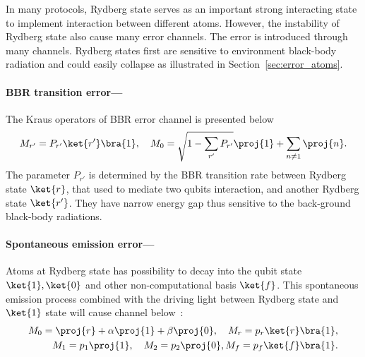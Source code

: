 \documentclass[11pt]{article}
\begin{document}
In many protocols, Rydberg state serves as an important strong interacting state to implement interaction between different atoms. However, the instability of Rydberg state also cause many error channels.
The error is introduced through many channels. Rydberg states first are sensitive to environment black-body radiation and could easily collapse as illustrated in Section~\ref{sec:error_atoms}. 
\paragraph*{BBR transition error---\!\!\!}
The Kraus operators of BBR error channel is presented below~\cite{PhysRevX.12.021049}
\begin{align}
M_{r'} = P_{r'} \ket{r'}\bra{1}, \quad M_0 = \sqrt{1 - \sum_{r'}P_{r'}} \proj{1} + \sum_{n \neq 1}\proj{n}.    
\end{align}
The parameter $P_{r'}$ is determined by the BBR transition rate between Rydberg state $\ket{r}$, that used to mediate two qubits interaction, and another Rydberg state $\ket{r'}$. They have narrow energy gap thus sensitive to the back-ground black-body radiations. 

\paragraph*{Spontaneous emission error---\!\!\!}
Atoms at Rydberg state has possibility to decay into the qubit state $\ket{1},\ket{0}$ and other non-computational basis $\ket{f}$. This spontaneous emission process combined with the driving light between Rydberg state and $\ket{1}$ state will cause channel below~\cite{PhysRevX.12.021049}:
\begin{align}
    M_0 = \proj{r} + \alpha \proj{1} + \beta \proj{0}, \quad M_r = p_r \ket{r}\bra{1}, \\
    \quad M_1 = p_1\proj{1}, \quad M_2 = p_2 \proj{0},M_f = p_f\ket{f}\bra{1}. \notag
\end{align}
\end{document}
